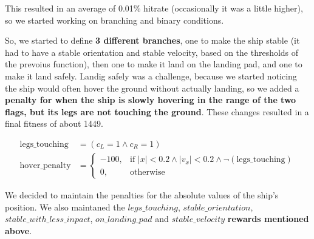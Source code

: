\documentclass[a4paper, 12pt, fleqn]{report}
\begin{document}
    
    \noindent
    This resulted in an average of 0.01\% hitrate (occasionally it was a little higher), so we started working on branching and binary conditions.

    So, we started to define \textbf{3 different branches}, one to make the ship stable (it had to have a stable orientation and stable velocity, based on the thresholds of the prevoius function), then one to make it land on the landing pad, and one to make it land safely.
    Landig safely was a challenge, because we started noticing the ship would often hover the ground without actually landing,
    so we added a \textbf{penalty for when the ship is slowly hovering in the range of the two flags, but its legs are not touching the ground}. These changes resulted in a final fitness of about 1449.\\

{\scriptsize
\begin{center}
    \begin{align*}
    \text{legs\_touching} &= (c_L = 1 \land c_R = 1) \\
    \text{hover\_penalty} &= 
    \begin{cases} 
    -100, & \text{if } |x| < 0.2 \land |v_x| < 0.2 \land \neg (\text{legs\_touching}) \\ 
    0, & \text{otherwise} 
    \end{cases}
    \end{align*}
\end{center}
}
    
    \noindent
    We decided to maintain the penalties for the absolute values of the ship's position.
    We also maintaned the $legs\_touching$, $stable\_orientation$, $stable\_with\_less\_inpact$, $on\_landing\_pad$ and $stable\_velocity$ \textbf{rewards mentioned above}.
    \\
\end{document}
